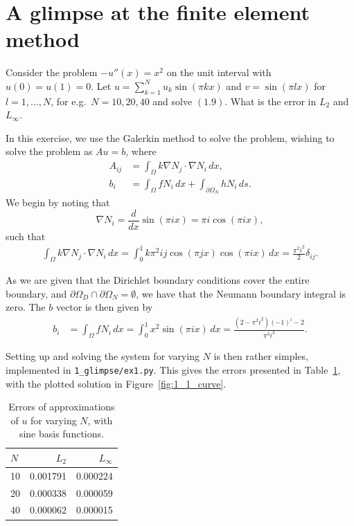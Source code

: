 \section{A glimpse at the finite element method}

\begin{exercise}
    Consider the problem $-u''(x) = x^2$ on the unit interval with $u(0) = u(1) = 0$.
    Let $u = \sum_{k = 1}^N u_k \sin{(\pi k x)}$ and $v = \sin{(\pi l x)}$ for $l = 1, \ldots, N$, for e.g.\ $N = 10, 20, 40$ and solve $(1.9)$.
    What is the error in $L_2$ and $L_\infty$.
\end{exercise}

\begin{solution}
    In this exercise, we use the Galerkin method to solve the problem, wishing to solve the problem as $Au = b$, where
    \begin{align*}
        A_{ij} &= \int_\Omega k \nabla N_j \cdot \nabla N_i \, dx, \\
        b_i &= \int_\Omega f N_i \, dx + \int_{\partial \Omega_N} h N_i \, ds.
    \end{align*}
    We begin by noting that
    \begin{equation*}
        \nabla N_i = \frac{d}{dx} \sin{(\pi i x)} = \pi i \cos{(\pi i x)},
    \end{equation*}
    such that
    \begin{align*}
        \int_\Omega k \nabla N_j \cdot \nabla N_i \, dx
        = \int_0^1 k \pi^2 i j \cos{(\pi j x)} \cos{(\pi i x)} \, dx
        = \frac{\pi^2 i^2}{2} \delta_{ij}.
    \end{align*}

    As we are given that the Dirichlet boundary conditions cover the entire boundary, and $\partial \Omega_D \cap \partial \Omega_N = \emptyset$, we have that the Neumann boundary integral is zero.
    The $b$ vector is then given by
    \begin{align*}
        b_i &= \int_\Omega f N_i \, dx
        = \int_0^1 x^2 \sin{(\pi i x)} \, dx
        = \frac{(2 - \pi^2 i^2)(-1)^i- 2}{\pi^3 i^3}.
    \end{align*}

    Setting up and solving the system for varying $N$ is then rather simples, implemented in \verb|1_glimpse/ex1.py|.
    This gives the errors presented in Table~\ref{tab:1_1}, with the plotted solution in Figure~\ref{fig:1_1_curve}.
    \begin{table}[!ht]
        \caption{Errors of approximations of $u$ for varying $N$, with sine basis functions.\label{tab:1_1}}
        \centering
        \begin{tabular}{lrr}
            \toprule
            $N$ & $L_2$ & $L_\infty$ \\
            \midrule
            10 & 0.001791 & 0.000224 \\
            20 & 0.000338 & 0.000059 \\
            40 & 0.000062 & 0.000015 \\
            \bottomrule
        \end{tabular}
    \end{table}


\end{solution}
